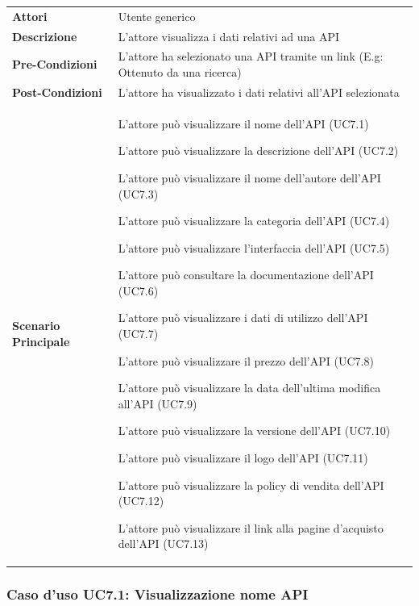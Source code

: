 \begin{longtable}{ l | p{11cm}}
	\hline
	\rowcolor{Gray}
	\multicolumn{2}{c}{UC7 - Visualizzazione API}\\
	\hline
	
	 \textbf{Attori} & Utente generico \\
	\textbf{Descrizione} & L'attore visualizza i dati relativi ad una API \\
	\textbf{Pre-Condizioni} & L'attore ha selezionato una API tramite un link (E.g: Ottenuto da una ricerca) \\
	\textbf{Post-Condizioni} & L'attore ha visualizzato i dati relativi all'API selezionata \\
	\textbf{Scenario Principale} &
	\begin{enumerate*}[label=(\arabic*.),itemjoin={\newline}]
		\item L'attore può visualizzare il nome dell'API (UC7.1)
		\item L'attore può visualizzare la descrizione dell'API (UC7.2)
		\item L'attore può visualizzare il nome dell'autore dell'API (UC7.3)
		\item L'attore può visualizzare la categoria dell'API (UC7.4)
		\item L'attore può visualizzare l'interfaccia dell'API (UC7.5)
		\item L'attore può consultare la documentazione dell'API (UC7.6)
		\item L'attore può visualizzare i dati di utilizzo dell'API (UC7.7)
		\item L'attore può visualizzare il prezzo dell'API (UC7.8)
		\item L'attore può visualizzare la data dell'ultima modifica all'API (UC7.9)
		\item L'attore può visualizzare la versione dell'API (UC7.10)
		\item L'attore può visualizzare il logo dell'API (UC7.11)
		\item L'attore può visualizzare la policy di vendita dell'API (UC7.12)
		\item L'attore può visualizzare il link alla pagine d'acquisto dell'API (UC7.13)
	\end{enumerate*}\\
\end{longtable}


\subsubsection{Caso d'uso UC7.1: Visualizzazione nome API}
\label{UC7_1}

